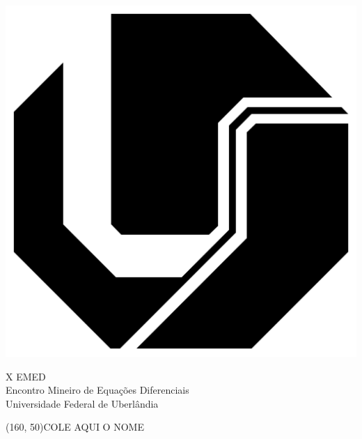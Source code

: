 \documentclass{article}
\begin{document}
{
	\noindent
	\begin{minipage}{11.6cm}
		\vspace{-3em}
\begin{minipage}[c][2cm][c]{0.25\textwidth}
\begin{center}
\includegraphics[scale=0.025]{logoufu.png}
\end{center}
\end{minipage}%
\begin{minipage}[c][2.5cm][c]{0.7\textwidth}
		\sffamily
		\begin{large}
		X EMED\\
		Encontro Mineiro de Equações Diferenciais\\
		Universidade Federal de Uberlândia\\
		\end{large}
\end{minipage}

		\begin{center}
		\framebox(160, 50){COLE AQUI O NOME} \par 
		\end{center}


\end{minipage}}
\end{document}
